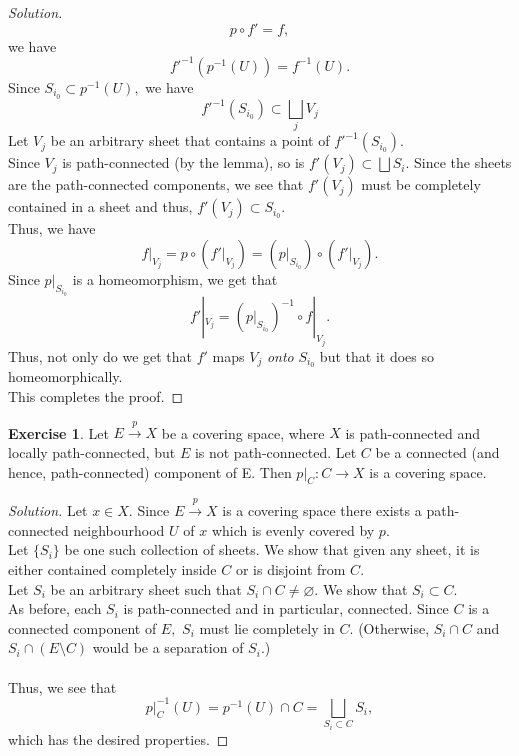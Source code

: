 \documentclass[12pt]{article}
\theoremstyle{definition}
\numberwithin{thm}{section}
\newtheorem{exe}[thm]{Exercise}
\let\emptyset\varnothing
\newenvironment{soln}{\begin{proof}[Solution]}{\end{proof}}
\begin{document}
\begin{soln}
\begin{equation*}
		p\circ f' = f,
	\end{equation*}
	we have
	\begin{equation*} 
		f'^{-1}(p^{-1}(U)) = f^{-1}(U).
	\end{equation*}
	Since $S_{i_0} \subset p^{-1}(U),$ we have 
	\begin{equation*} 
		f'^{-1}(S_{i_0}) \subset \bigsqcup_j V_j
	\end{equation*}
	Let $V_j$ be an arbitrary sheet that contains a point of $f'^{-1}(S_{i_0}).$\\
	Since $V_j$ is path-connected (by the lemma), so is $f'(V_j) \subset \bigsqcup S_i.$ Since the sheets are the path-connected components, we see that $f'(V_j)$ must be completely contained in a sheet and thus, $f'(V_j) \subset S_{i_0}.$ \\
	Thus, we have
	\begin{equation*} 
		f|_{V_j} = p\circ(f'|_{V_j}) = \left(p|_{S_{i_0}}\right)\circ\left(f'|_{V_j}\right).
	\end{equation*}
	Since $p|_{S_{i_0}}$ is a homeomorphism, we get that
	\begin{equation*} 
		f'|_{V_j} = \left(p|_{S_{i_0}}\right)^{-1}\circ f|_{V_j}.
	\end{equation*}
	Thus, not only do we get that $f'$ maps $V_j$ \emph{onto} $S_{i_0}$ but that it does so homeomorphically.\\
	This completes the proof.	
\end{soln}

\begin{exe}
	Let $E\overset{p}{\longrightarrow}X$ be a covering space, where $X$ is path-connected and locally path-connected, but $E$ is not path-connected. Let $C$ be a connected (and hence, path-connected) component of E. Then $p|_C:C\to X$ is a covering space.
\end{exe}
\begin{soln}
	Let $x \in X.$ Since $E\overset{p}{\longrightarrow}X$ is a covering space there exists a path-connected neighbourhood $U$ of $x$ which is evenly covered by $p.$ \\
	Let $\{S_i\}$ be one such collection of sheets. We show that given any sheet, it is either contained completely inside $C$ or is disjoint from $C.$\\
	Let $S_i$ be an arbitrary sheet such that $S_i \cap C \neq \emptyset.$ We show that $S_i \subset C.$\\
	As before, each $S_i$ is path-connected and in particular, connected. Since $C$ is a connected component of $E,$ $S_i$ must lie completely in $C.$ (Otherwise, $S_i \cap C$ and $S_i \cap (E \setminus C)$ would be a separation of $S_i$.)\\~\\
	Thus, we see that
	\begin{equation*} 
		p|_C^{-1}(U) = p^{-1}(U) \cap C = \bigsqcup_{S_i \subset C}S_i,
	\end{equation*}
	which has the desired properties.
\end{soln}
\end{document}
